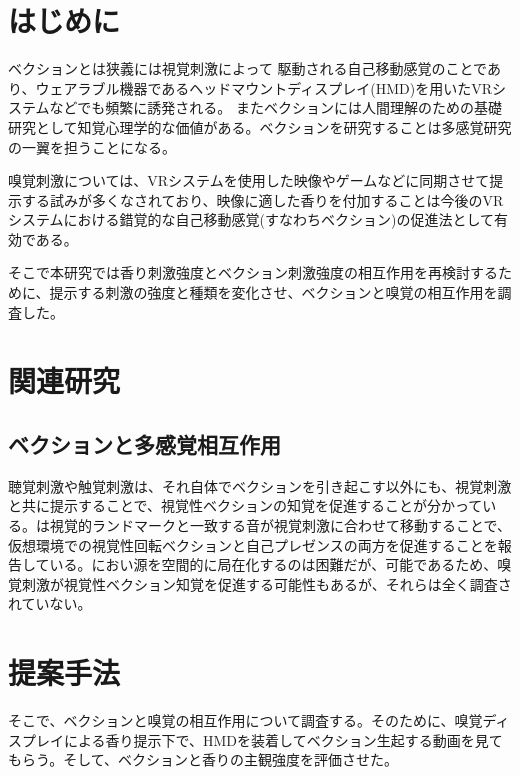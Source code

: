 \documentclass[uplatex]{jsarticle}   %
\begin{document}

\vspace{3mm}

\setcounter{page}{5}



\section{はじめに}
ベクションとは狭義には視覚刺激によって
駆動される自己移動感覚のことであり、ウェアラブル機器であるヘッドマウントディスプレイ(HMD)を用いたVRシステムなどでも頻繁に誘発される\cite{翔悟17}。
またベクションには人間理解のための基礎研究として知覚心理学的な価値がある。ベクションを研究することは多感覚研究の一翼を担うことになる。

嗅覚刺激については、VRシステムを使用した映像やゲームなどに同期させて提示する試みが多くなされており、映像に適した香りを付加することは今後のVRシステムにおける錯覚的な自己移動感覚(すなわちベクション)の促進法として有効である。

そこで本研究では香り刺激強度とベクション刺激強度の相互作用を再検討するために、提示する刺激の強度と種類を変化させ、ベクションと嗅覚の相互作用を調査した。

\section{関連研究}
\subsection{ベクションと多感覚相互作用}
聴覚刺激や触覚刺激は、それ自体でベクションを引き起こす以外にも、視覚刺激と共に提示することで、視覚性ベクションの知覚を促進することが分かっている。\cite{翔悟20}は視覚的ランドマークと一致する音が視覚刺激に合わせて移動することで、仮想環境での視覚性回転ベクションと自己プレゼンスの両方を促進することを報告している。におい源を空間的に局在化するのは困難だが、可能であるため\cite{翔悟21}、嗅覚刺激が視覚性ベクション知覚を促進する可能性もあるが、それらは全く調査されていない。

\section{提案手法}
そこで、ベクションと嗅覚の相互作用について調査する。そのために、嗅覚ディスプレイによる香り提示下で、HMDを装着してベクション生起する動画を見てもらう。そして、ベクションと香りの主観強度を評価させた。
\end{document}
